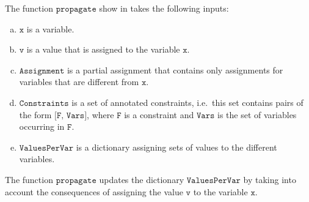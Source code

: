 The function $\texttt{propagate}$ show in  takes the following inputs:
\begin{enumerate}[(a)]
\item $\texttt{x}$ is a variable.
\item $\texttt{v}$ is a value that is assigned to the variable $\texttt{x}$.
\item $\texttt{Assignment}$ is a partial assignment that contains only assignments for variables that are
      different from $\texttt{x}$.
\item $\texttt{Constraints}$ is a set of annotated constraints, i.e.~this set contains pairs of the form 
      $\texttt{[F, Vars]}$, where $\texttt{F}$ is a constraint and $\texttt{Vars}$ is the set of
      variables occurring in $\texttt{F}$.
\item $\texttt{ValuesPerVar}$ is a dictionary assigning sets of values to the different variables.
\end{enumerate}
The function $\texttt{propagate}$ updates the dictionary $\texttt{ValuesPerVar}$ by taking into account the
consequences of assigning the value $\texttt{v}$ to the variable $\texttt{x}$.
